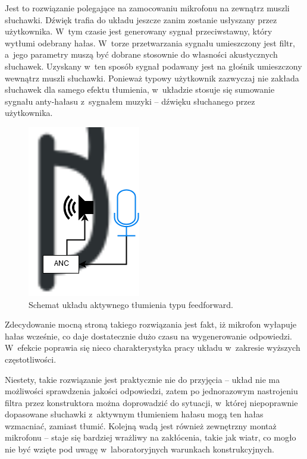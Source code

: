 Jest to rozwiązanie polegające na zamocowaniu mikrofonu na zewnątrz muszli słuchawki. Dźwięk trafia do układu jeszcze zanim zostanie usłyszany przez użytkownika. W~tym czasie jest generowany sygnał przeciwstawny, który wytłumi odebrany hałas. W~torze przetwarzania sygnału umieszczony jest filtr, a~jego parametry muszą być dobrane stosownie do własności akustycznych słuchawek. Uzyskany w~ten sposób sygnał podawany jest na głośnik umieszczony wewnątrz muszli słuchawki. Ponieważ typowy użytkownik zazwyczaj nie zakłada słuchawek dla samego efektu tłumienia, w~układzie stosuje się sumowanie sygnału anty-hałasu z~sygnałem muzyki -- dźwięku słuchanego przez użytkownika.
\begin{figure}[h!]
	\centering
	\includegraphics[scale=0.7]{../Assets/feedforward.png}
	\caption{Schemat układu aktywnego tłumienia typu feedforward.}
	\label{fig:feedforward}
\end{figure}

Zdecydowanie mocną stroną takiego rozwiązania jest fakt, iż mikrofon wyłapuje hałas wcześnie, co daje dostatecznie dużo czasu na wygenerowanie odpowiedzi. W~efekcie poprawia się nieco charakterystyka pracy układu w~zakresie wyższych częstotliwości.

Niestety, takie rozwiązanie jest praktycznie nie do przyjęcia -- układ nie ma możliwości sprawdzenia jakości odpowiedzi, zatem po jednorazowym nastrojeniu filtra przez konstruktora można doprowadzić do sytuacji, w~której niepoprawnie dopasowane słuchawki z~aktywnym tłumieniem hałasu mogą ten hałas wzmacniać, zamiast tłumić. Kolejną wadą jest również zewnętrzny montaż mikrofonu -- staje się bardziej wrażliwy na zakłócenia, takie jak wiatr, co mogło nie być wzięte pod uwagę w~laboratoryjnych warunkach konstrukcyjnych.
